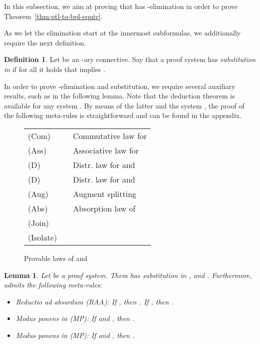 \documentclass[a4paper,english,fleqn,11pt,final]{scrartcl}
\newcommand{\Deriv}[1]{{\normalfont\textsf{#1}}}
\theoremstyle{plain}
\newtheorem{lemma}[theorem]{Lemma}
\theoremstyle{definition}
\newtheorem{definition}[theorem]{Definition}
\begin{document}
In this subsection, we aim at proving that  has -elimination in order to prove Theorem~\ref{thm:ptl-to-bpl-equiv}.

As we let the elimination start at the innermost subformulas, we additionally require the next definition.

\begin{definition}
Let  be an -ary connective.
Say that a proof system  has \emph{substitution in } if for all  it holds that  implies .
\end{definition}

\label{pg:metarules}

In order to prove -elimination and substitution, we require several auxiliary results, such as in the following lemma.
Note that the deduction theorem is available for any system .
By means of the latter and the system , the proof of the following meta-rules is straightforward and can be found in the appendix.

\begin{figure}[b]\centering
\begin{tabular}{lll}
		\toprule
		\Deriv{(Com)}&&Commutative law for \\
		\Deriv{(Ass)}&&Associative law for \\
		\Deriv{(D)}&&Distr. law for  and \\
		\Deriv{(D)}&&Distr. law for  and \\
		\Deriv{(Aug)}&&Augment splitting\\
		\Deriv{(Abs)}&&Absorption law of \\
		\Deriv{(Join)}&&\\
		\Deriv{(Isolate)}&&\\
		\bottomrule
	\end{tabular}
	\caption{Provable laws  of  and }\label{fig:splitting2}
\end{figure}

\begin{lemma}\label{lem:meta-ptl}
Let  be a proof system.
Them  has substitution in ,  and .
Furthermore,  admits the following meta-rules:
\begin{itemize}
	\item Reductio ad absurdum \Deriv{(RAA)}:
	If , then .
	If , then .
	\item Modus ponens in  \Deriv{(MP)}:
	If  and , then .
	\item Modus ponens in  \Deriv{(MP)}:
	If  and , then .
\end{itemize}
\end{lemma}
\end{document}
